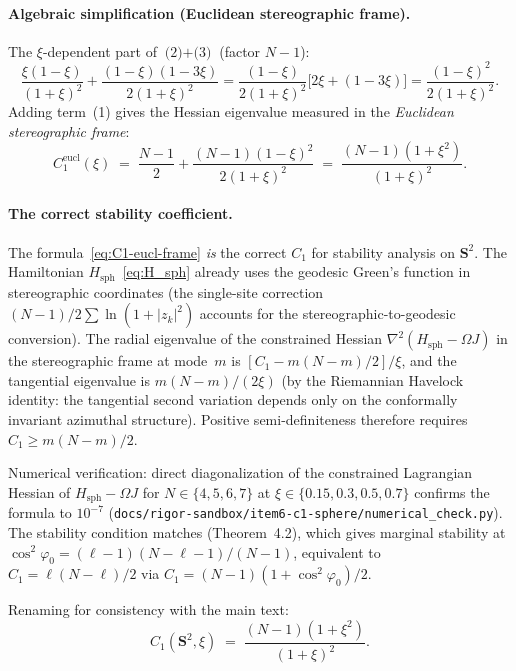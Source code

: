 \paragraph{Algebraic simplification (Euclidean stereographic frame).}
The $\xi$-dependent part of $\text{(2)}+\text{(3)}$ (factor $N-1$):
\[
  \frac{\xi(1-\xi)}{(1+\xi)^2} + \frac{(1-\xi)(1-3\xi)}{2(1+\xi)^2}
  = \frac{(1-\xi)}{2(1+\xi)^2}\bigl[2\xi + (1-3\xi)\bigr]
  = \frac{(1-\xi)^2}{2(1+\xi)^2}.
\]
Adding term~(1) gives the Hessian eigenvalue measured in the
\emph{Euclidean stereographic frame}:
\begin{equation}\label{eq:C1-eucl-frame}
  C_1^{\mathrm{eucl}}(\xi)
  \;=\; \frac{N-1}{2} + \frac{(N-1)(1-\xi)^2}{2(1+\xi)^2}
  \;=\; \frac{(N-1)(1+\xi^2)}{(1+\xi)^2}.
\end{equation}

\paragraph{The correct stability coefficient.}
The formula~\eqref{eq:C1-eucl-frame} \emph{is} the correct $C_1$
for stability analysis on $\mathbf{S}^2$.  The Hamiltonian
$H_{\mathrm{sph}}$~\eqref{eq:H_sph} already uses the geodesic
Green's function in stereographic coordinates (the single-site
correction $(N{-}1)/2\sum\ln(1+|z_k|^2)$ accounts for the
stereographic-to-geodesic conversion).  The radial eigenvalue
of the constrained Hessian $\nabla^2(H_{\mathrm{sph}} - \Omega J)$
in the stereographic frame at mode~$m$ is
$[C_1 - m(N{-}m)/2]/\xi$, and the tangential eigenvalue is
$m(N{-}m)/(2\xi)$ (by the Riemannian Havelock identity: the
tangential second variation depends only on the conformally
invariant azimuthal structure).  Positive semi-definiteness
therefore requires $C_1 \ge m(N{-}m)/2$.

Numerical verification: direct diagonalization of the constrained
Lagrangian Hessian of $H_{\mathrm{sph}} - \Omega J$ for
$N \in \{4,5,6,7\}$ at $\xi \in \{0.15, 0.3, 0.5, 0.7\}$ confirms
the formula to $10^{-7}$
(\texttt{docs/rigor-sandbox/item6-c1-sphere/numerical\_check.py}).
The stability condition matches
\citet{LaurentPolzMontaldiRoberts2005} (Theorem~4.2), which gives
marginal stability at $\cos^2\!\varphi_0 = (\ell{-}1)(N{-}\ell{-}1)/(N{-}1)$,
equivalent to $C_1 = \ell(N{-}\ell)/2$ via $C_1 = (N{-}1)(1 + \cos^2\!\varphi_0)/2$.

Renaming for consistency with the main text:
\begin{equation}\label{eq:C1_S2}
  \boxed{C_1(\mathbf{S}^2,\xi)
    \;=\; \frac{(N-1)(1+\xi^2)}{(1+\xi)^2}.}
\end{equation}

